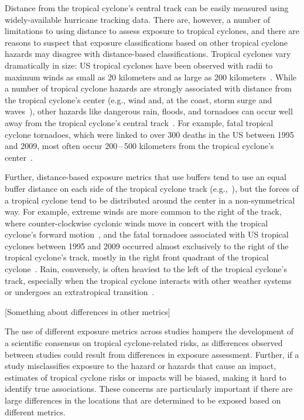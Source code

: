 Distance from the tropical cyclone's central track can be easily measured using
widely-available hurricane tracking data. There are, however, a number of
limitations to using distance to assess exposure to tropical cyclones, and
there are reasons to suspect that exposure classifications based on other
tropical cyclone hazards may disagree with distance-based classifications.
Tropical cyclones vary dramatically in size: \ac{US} tropical cyclones have been
observed with radii to maximum winds as small as 20 kilometers and as large as
200 kilometers~\citep{mallin2006, quiring2011variations}. While a number of
tropical cyclone hazards are strongly associated with distance from the
tropical cyclone's center (e.g., wind and, at the coast, storm surge and 
waves~\citep{rappaport2000, kruk2010}), other hazards like dangerous rain, 
floods, and tornadoes can occur well away from the tropical cyclone's central 
track~\citep{rappaport2000, atallah2007, moore2012}.  For example, fatal tropical
cyclone tornadoes, which were linked to over 300 deaths in the \ac{US}  between
1995 and 2009, most often occur 200\,--\,500 kilometers from the tropical cyclone's
center~\citep{moore2012}. 

Further, distance-based exposure metrics that use
buffers tend to use an equal buffer distance on each side of the tropical
cyclone track (e.g.,~\citep{czajkowski2011, grabich2015, grabich2016,
zandbergen2009, tansel2010}), but the forces of a tropical cyclone tend to be
distributed around the center in a non-symmetrical way. For example, extreme
winds are more common to the right of the track, where counter-clockwise
cyclonic winds move in concert with the tropical cyclone's forward 
motion~\citep{halverson2015}, and the fatal tornadoes associated with \ac{US} tropical
cyclones between 1995 and 2009 occurred almost exclusively to the right of the
tropical cyclone's track, mostly in the right front quadrant of the tropical
cyclone~\citep{moore2012}. Rain, conversely, is often heaviest to the left of
the tropical cyclone's track, especially when the tropical cyclone interacts
with other weather systems~\citep{atallah2003, atallah2007, zhu2013variations}
or undergoes an extratropical transition~\citep{elsberry2002}.

[Something about differences in other metrics]

The use of different exposure metrics across studies hampers the development of
a scientific consensus on tropical cyclone-related risks, as differences
observed between studies could result from differences in exposure assessment.
Further, if a study misclassifies exposure to the hazard or hazards that cause
an impact, estimates of tropical cyclone risks or impacts will be biased,
making it hard to identify true associations. These concerns are particularly
important if there are large differences in the locations that are determined
to be exposed based on different metrics.  

